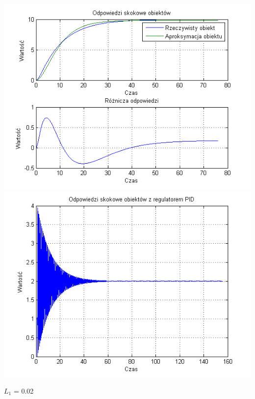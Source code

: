 \documentclass[10pt,a4paper]{article}
\begin{document}
\begin{center}
\includegraphics[scale=1]{images/dwa/skrypt_207.png}\\
\includegraphics[scale=1]{images/dwa/skrypt_208.png}\\
\end{center}
\newpage
$L_1$ = 0.02
\end{document}
